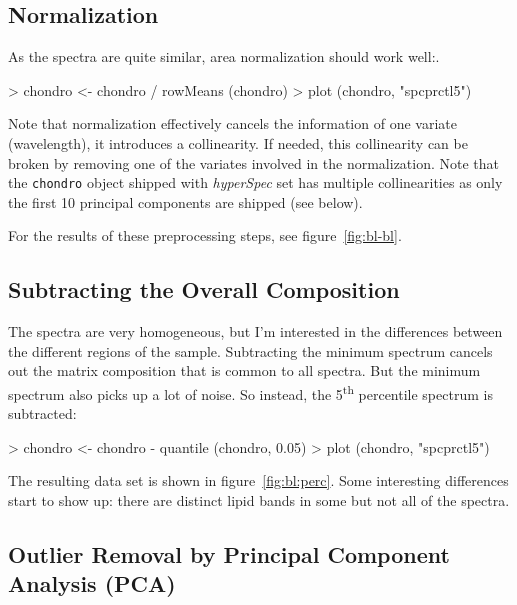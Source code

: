 \documentclass[english, a4paper, 10pt, headings=small, DIV11]{scrartcl}
\renewenvironment{Schunk}{\vspace{0pt}\begin{small}}{\end{small}\vspace{0pt}}
\newcommand{\Robject}[2][]{\texorpdfstring{\nohyphens{#1\texttt{#2}}}{#2}}
\newcommand{\phy}{\texorpdfstring{\nohyphens{\textit{hyperSpec}}}{hyperSpec}\xspace}
\begin{document}
\subsection{Normalization}

As the spectra are quite similar, area normalization should work well:.

\begin{Schunk}
\begin{Sinput}
> chondro <- chondro / rowMeans (chondro)
> plot (chondro, "spcprctl5")
\end{Sinput}
\end{Schunk}

Note that normalization effectively cancels the information of one variate (wavelength), it
introduces a collinearity. If needed, this collinearity can be broken by removing one of the variates
involved in the normalization. Note that the \Robject{chondro} object shipped with \phy set has
multiple collinearities as only the first 10 principal components are shipped (see below).

For the results of these preprocessing steps, see figure~\ref{fig:bl-bl}.

\subsection{Subtracting the Overall Composition}

The spectra are very homogeneous, but I'm interested in the differences
between the different regions of the sample. Subtracting the minimum
spectrum cancels out the matrix composition that is common to all spectra.
But the minimum spectrum also picks up a lot of noise. So instead,
the 5\textsuperscript{th} percentile spectrum is subtracted:

\begin{Schunk}
\begin{Sinput}
> chondro <- chondro - quantile (chondro, 0.05)
> plot (chondro, "spcprctl5")
\end{Sinput}
\end{Schunk}

The resulting data set is shown in figure~\ref{fig:bl:perc}. Some
interesting differences start to show up: there are distinct lipid
bands in some but not all of the spectra.


\subsection{Outlier Removal by Principal Component Analysis (PCA)}
\end{document}
